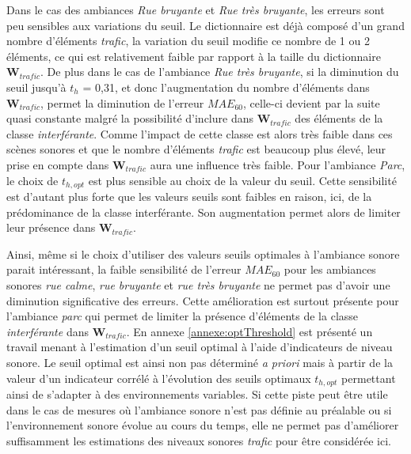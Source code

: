 Dans le cas des ambiances \textit{Rue bruyante} et \textit{Rue très bruyante}, les erreurs sont peu sensibles aux variations du seuil. Le dictionnaire est déjà composé d'un grand nombre d'éléments \textit{trafic}, la variation du seuil modifie ce nombre de 1 ou 2 éléments, ce qui est relativement faible par rapport à la taille du dictionnaire $\mathbf{W}_{trafic}$. 
De plus dans le cas de l'ambiance \textit{Rue très bruyante}, si la diminution du seuil jusqu'à $t_h$ = 0,31, et donc l'augmentation du nombre d'éléments dans $\mathbf{W}_{trafic}$, permet la diminution de l'erreur $MAE_{60}$, celle-ci devient par la suite quasi constante malgré la possibilité d'inclure dans $\mathbf{W}_{trafic}$ des éléments de la classe \textit{interférante}. 
Comme l'impact de cette classe est alors très faible dans ces scènes sonores et que le nombre d'éléments \textit{trafic} est beaucoup plus élevé, leur prise en compte dans $\mathbf{W}_{trafic}$ aura une influence très faible. 
Pour l'ambiance \textit{Parc}, le choix de $t_{h,opt}$ est plus sensible au choix de la valeur du seuil. Cette sensibilité est d'autant plus forte que les valeurs seuils sont faibles en raison, ici, de la prédominance de la classe interférante. Son augmentation permet alors de limiter leur présence dans $\mathbf{W}_{trafic}$.

Ainsi, même si le choix d'utiliser des valeurs seuils optimales à l'ambiance sonore parait intéressant, la faible sensibilité de l'erreur $MAE_{60}$ pour les ambiances sonores \textit{rue calme}, \textit{rue bruyante} et \textit{rue très bruyante} ne permet pas d'avoir une diminution significative des erreurs. Cette amélioration est surtout présente pour l'ambiance \textit{parc} qui permet de limiter la présence d'éléments de la classe \textit{interférante} dans $\mathbf{W}_{trafic}$.
En annexe \ref{annexe:optThreshold} est présenté un travail menant à l'estimation d'un seuil optimal à l'aide d'indicateurs de niveau sonore. Le seuil optimal est ainsi non pas déterminé \textit{a priori} mais à partir de la valeur d'un indicateur corrélé à l'évolution des seuils optimaux $t_{h,opt}$ permettant ainsi de s'adapter à des environnements variables. Si cette piste peut être utile dans le cas de mesures où l'ambiance sonore n'est pas définie au préalable ou si l'environnement sonore évolue au cours du temps, elle ne permet pas d'améliorer suffisamment les estimations des niveaux sonores \textit{trafic} pour être considérée ici.\\

